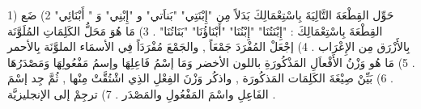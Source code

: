 \documentclass[a4paper]{article}
\begin{document}
\begin{flushright}
1)       حَوِّل القِطْعَةَ التَّالِيَةَ بِاسْتِعْمَالِكَ بَدَلاً مِن "إِبْنَتِي"
"بَناَتي"  و "إِبْنِي"  وَ " أَبْنَائِي"
2) ضَع القِطْعَةَ بِاسْتِعْمَالِكَ : "إِبْنَتُنَا" "إِبْنُنَا" "أَبْنَاؤُنَا" "بَنَاتُنَا" .
3)       مَا هُوَ مَحَلُّ الكَلِمَاتِ المُلَوَّنَة بِالأَزْرَق مِن الإِعْرَاب .
4)  إجْعَلْ المُفْرَدَ جَمْعَاً , والجَمْعَ مُفْرَدَاً فِي الأسمَاء الملوَّنَة بِالأحمر .
5)       مَا هُو وَزْنُ الأَفْعاَلِ المَذْكُورَةِ باللون الأخضر وَمَا إسْمُ فَاعِلِهَا وإسمُ مَفْعُولِهَا وَمَصْدَرُهَا .
6)  بَيِّنْ صِيْغَةَ الكَلِمَات المَذكُورَة , واذكُر وَزْنَ الفِعْلِ الذِي اشْتُقَّتْ مِنْها , ثُمَّ جِد إسْمَ الفَاعِلِ واسْمَ المَفْعُولِ والمَصْدَر .
7) ترجِمْ إلى الإنجليزيَّة .
\end{flushright}
\end{document}
